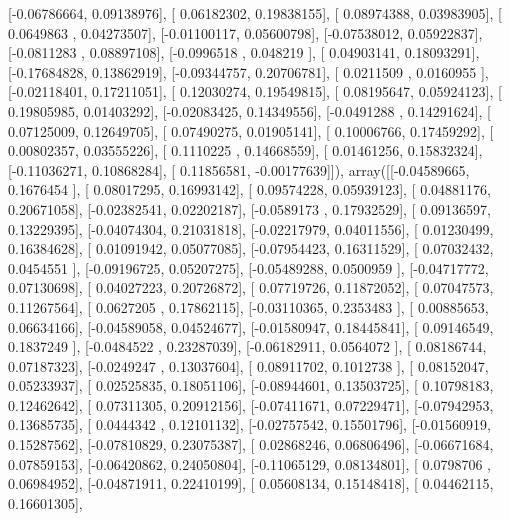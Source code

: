\documentclass{article}
\begin{document}
       [-0.06786664,  0.09138976],
       [ 0.06182302,  0.19838155],
       [ 0.08974388,  0.03983905],
       [ 0.0649863 ,  0.04273507],
       [-0.01100117,  0.05600798],
       [-0.07538012,  0.05922837],
       [-0.0811283 ,  0.08897108],
       [-0.0996518 ,  0.048219  ],
       [ 0.04903141,  0.18093291],
       [-0.17684828,  0.13862919],
       [-0.09344757,  0.20706781],
       [ 0.0211509 ,  0.0160955 ],
       [-0.02118401,  0.17211051],
       [ 0.12030274,  0.19549815],
       [ 0.08195647,  0.05924123],
       [ 0.19805985,  0.01403292],
       [-0.02083425,  0.14349556],
       [-0.0491288 ,  0.14291624],
       [ 0.07125009,  0.12649705],
       [ 0.07490275,  0.01905141],
       [ 0.10006766,  0.17459292],
       [ 0.00802357,  0.03555226],
       [ 0.1110225 ,  0.14668559],
       [ 0.01461256,  0.15832324],
       [-0.11036271,  0.10868284],
       [ 0.11856581, -0.00177639]]), array([[-0.04589665,  0.1676454 ],
       [ 0.08017295,  0.16993142],
       [ 0.09574228,  0.05939123],
       [ 0.04881176,  0.20671058],
       [-0.02382541,  0.02202187],
       [-0.0589173 ,  0.17932529],
       [ 0.09136597,  0.13229395],
       [-0.04074304,  0.21031818],
       [-0.02217979,  0.04011556],
       [ 0.01230499,  0.16384628],
       [ 0.01091942,  0.05077085],
       [-0.07954423,  0.16311529],
       [ 0.07032432,  0.0454551 ],
       [-0.09196725,  0.05207275],
       [-0.05489288,  0.0500959 ],
       [-0.04717772,  0.07130698],
       [ 0.04027223,  0.20726872],
       [ 0.07719726,  0.11872052],
       [ 0.07047573,  0.11267564],
       [ 0.0627205 ,  0.17862115],
       [-0.03110365,  0.2353483 ],
       [ 0.00885653,  0.06634166],
       [-0.04589058,  0.04524677],
       [-0.01580947,  0.18445841],
       [ 0.09146549,  0.1837249 ],
       [-0.0484522 ,  0.23287039],
       [-0.06182911,  0.0564072 ],
       [ 0.08186744,  0.07187323],
       [-0.0249247 ,  0.13037604],
       [ 0.08911702,  0.1012738 ],
       [ 0.08152047,  0.05233937],
       [ 0.02525835,  0.18051106],
       [-0.08944601,  0.13503725],
       [ 0.10798183,  0.12462642],
       [ 0.07311305,  0.20912156],
       [-0.07411671,  0.07229471],
       [-0.07942953,  0.13685735],
       [ 0.0444342 ,  0.12101132],
       [-0.02757542,  0.15501796],
       [-0.01560919,  0.15287562],
       [-0.07810829,  0.23075387],
       [ 0.02868246,  0.06806496],
       [-0.06671684,  0.07859153],
       [-0.06420862,  0.24050804],
       [-0.11065129,  0.08134801],
       [ 0.0798706 ,  0.06984952],
       [-0.04871911,  0.22410199],
       [ 0.05608134,  0.15148418],
       [ 0.04462115,  0.16601305],
\end{document}
